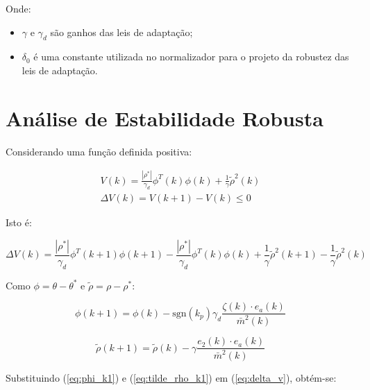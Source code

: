     Onde:

    \begin{itemize}[leftmargin=+2cm]
        \item[] $\gamma$ e $\gamma_d$ são ganhos das leis de adaptação;
        \item[] $\delta_0$ é uma constante utilizada no normalizador para o projeto
            da robustez das leis de adaptação.
    \end{itemize}

    \section{Análise de Estabilidade Robusta}

    Considerando uma função definida positiva:

    \begin{equation}
        \begin{split}
            V(k) = \frac{|\rho^*|}{\gamma_d} \phi^T(k) \phi(k) + \frac{1}{\gamma} {\tilde{\rho}}^2(k) \\
            \Delta V(k) = V(k+1) - V(k) \leq 0
        \end{split}
    \end{equation}

    Isto é:

    \begin{equation}
        \Delta V(k) = \frac{|\rho^*|}{\gamma_d} \phi^T(k+1) \phi(k+1) - \frac{|\rho^*|}{\gamma_d} \phi^T(k) \phi(k)
            + \frac{1}{\gamma} {\tilde{\rho}}^2(k+1) - \frac{1}{\gamma} {\tilde{\rho}}^2(k)
        \label{eq:delta_v}
    \end{equation}

    Como $\phi = \theta - \theta^*$ e $\tilde{\rho} = \rho - \rho^*$:

    \begin{equation}
        \phi(k+1) = \phi(k) - \mathrm{sgn}(k_p) \gamma_d \frac{\zeta(k) \cdot e_a(k)}{{\bar{m}}^2(k)}
        \label{eq:phi_k1}
    \end{equation}

    \begin{equation}
        \tilde{\rho}(k+1) = \tilde{\rho}(k) - \gamma \frac{e_2(k) \cdot e_a(k)}{{\bar{m}}^2(k)}
        \label{eq:tilde_rho_k1}
    \end{equation}

    Substituindo (\ref{eq:phi_k1}) e (\ref{eq:tilde_rho_k1}) em (\ref{eq:delta_v}), obtém-se:

